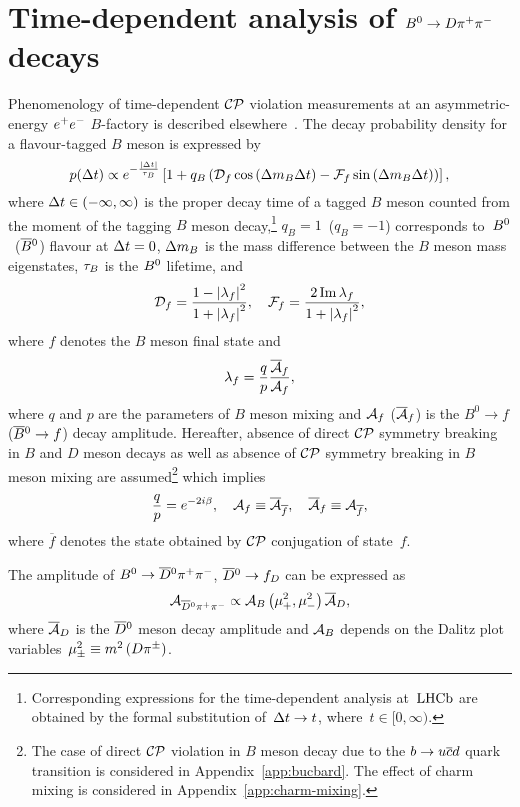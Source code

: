 \documentclass[a4paper,11pt]{article}
\begin{document}
\section{\boldmath Time-dependent analysis of \texorpdfstring{$B^0\to D\pi^+\pi^-$}{B0 to 
anti-D0 pi+ pi-} decays}\label{sec:pdfs}
Phenomenology of time-dependent $\mathcal{CP}$ violation measurements at an 
asymmetric-energy $e^+e^-$ $B$-factory is described elsewhere~\cite{BPhys}.  
The decay probability density for a flavour-tagged $B$ meson is expressed by
\begin{equation}\label{eq:raw_pdf}
  p(\Delta t) \propto e^{-\frac{\left|\Delta t\right|}{\tau_B}}\left[1 +q_B\left(\mathcal{D}_f\cos{\left(\Delta m_B\Delta t\right)}-\mathcal{F}_f\sin{\left(\Delta m_B\Delta t\right)}\right)\right],
\end{equation}
where $\Delta t\in\left(-\infty, \infty\right)$ is the proper decay time of a tagged $B$ 
meson counted from the moment of the tagging $B$ meson decay,\footnote{Corresponding 
expressions for the time-dependent analysis at~$\mathrm{LHCb}$ are obtained by the formal 
substitution of~$\Delta t\to t$, where~$t\in[0, \infty)$.} 
$q_B = 1$~($q_B = -1$) corresponds to~$B^0$~($\overline{B}{}^0$) flavour at $\Delta t = 0$, 
$\Delta m_B$ is the mass difference between the $B$ meson mass eigenstates, $\tau_B$
is the $B^0$ lifetime, and
\begin{equation}
  \mathcal{D}_f = \frac{1-\left|\lambda_f\right|^2}{1+\left|\lambda_f\right|^2},\quad 
  \mathcal{F}_f = \frac{2\,\mathrm{Im}\,\lambda_f}{1+\left|\lambda_f\right|^2},
\end{equation}
where $f$ denotes the $B$ meson final state and
\begin{equation}
  \lambda_f=\frac{q}{p}\frac{\overline{\mathcal{A}}{}_f}{\mathcal{A}_f},
\end{equation}
where $q$ and $p$ are the parameters of $B$ meson mixing and $\mathcal{A}_f$ ($\overline{\mathcal{A}}{}_f$) 
is the $B^0\to f$ ($\overline{B}{}^0\to f$) decay amplitude.  Hereafter, absence of 
direct $\mathcal{CP}$ symmetry breaking in $B$ and $D$ meson decays as well as 
absence of $\mathcal{CP}$ symmetry breaking in $B$ meson mixing are assumed\footnote{
The case of direct $\mathcal{CP}$ violation in $B$ meson decay due to
the $b\to u\overline{c}d$ quark transition is considered in Appendix~\ref{app:bucbard}. 
The effect of charm mixing is considered in Appendix~\ref{app:charm-mixing}.}
which implies
\begin{equation}
  \frac{q}{p} = e^{-2i\beta},\quad \mathcal{A}_f\equiv\overline{\mathcal{A}}{}_{\overline{f}},\quad \overline{\mathcal{A}}{}_f\equiv\mathcal{A}_{\overline{f}},
\end{equation}
where $\overline{f}$ denotes the state obtained by $\mathcal{CP}$ 
conjugation of state~$f$.

The amplitude of $B^0\to\overline{D}{}^0\pi^+\pi^-$, $\overline{D}{}^0\to f_D$ can be expressed as
\begin{equation}
 \mathcal{A}_{\overline{D}{}^0\pi^+\pi^-} \propto \mathcal{A}_B\left(\mu^2_{+},\mu^2_{-}\right)\overline{\mathcal{A}}_D,
\end{equation}
where $\overline{\mathcal{A}}_D$ is the $\overline{D}{}^0$ meson decay amplitude and $\mathcal{A}_B$ depends on the 
Dalitz plot variables~$\mu_{\pm}^2 \equiv m^2\left( D\pi^{\pm}\right)$. 
\end{document}
